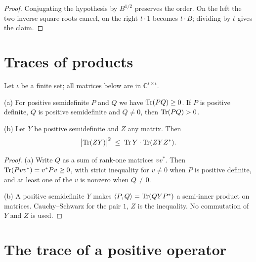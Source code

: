 \begin{proof}
\leanok
Conjugating the hypothesis by $B^{1/2}$ preserves the order. On the left the two
inverse square roots cancel, on the right $t \cdot 1$ becomes $t \cdot B$; dividing by
$t$ gives the claim.
\end{proof}

\section{Traces of products}

\begin{lemma}
\label{lem:trace-inequalities}
\leanok
Let $\iota$ be a finite set; all matrices below are in $\mathbb{C}^{\iota \times \iota}$.

(a) For positive semidefinite $P$ and $Q$ we have $\operatorname{Tr} (P Q) \geq 0$. If $P$ is
positive definite, $Q$ is positive semidefinite and $Q \neq 0$, then
$\operatorname{Tr} (P Q) > 0$.

(b) Let $Y$ be positive semidefinite and $Z$ any matrix. Then
\[
  \bigl| \operatorname{Tr} (Z Y) \bigr|^2 \; \leq \; \operatorname{Tr} Y \cdot \operatorname{Tr} (Z Y Z^*) .
\]
\end{lemma}

\begin{proof}
\leanok
(a) Write $Q$ as a sum of rank-one matrices $v v^*$. Then
$\operatorname{Tr} (P v v^*) = v^* P v \geq 0$, with strict inequality for $v \neq 0$ when $P$ is
positive definite, and at least one of the $v$ is nonzero when $Q \neq 0$.

(b) A positive semidefinite $Y$ makes $\langle P, Q \rangle = \operatorname{Tr} (Q Y P^*)$ a
semi-inner product on matrices. Cauchy--Schwarz for the pair $1$, $Z$ is the
inequality. No commutation of $Y$ and $Z$ is used.
\end{proof}

\section{The trace of a positive operator}

